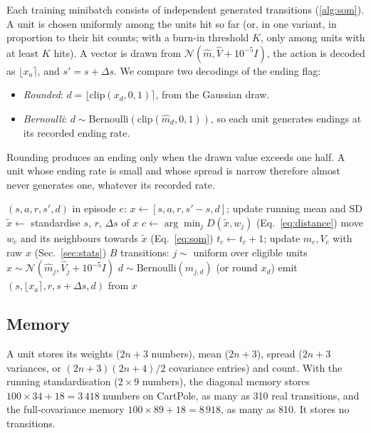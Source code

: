 \documentclass{article}
\newcommand{\dS}{\Delta s}
\begin{document}
Each training minibatch consists of independent generated transitions
(\cref{alg:som}). A unit is chosen uniformly among the units hit so far (or,
in one variant, in proportion to their hit counts; with a burn-in threshold
$K$, only among units with at least $K$ hits). A vector is drawn from
$\mathcal{N}(\hat{m}, \hat{V} + 10^{-5} I)$, the action is decoded as
$\lfloor x_a \rceil$, and $s' = s + \dS$. We compare two decodings of the
ending flag:
\begin{itemize}
\item \emph{Rounded}: $d = \lfloor \mathrm{clip}(x_d, 0, 1) \rceil$, from the
  Gaussian draw.
\item \emph{Bernoulli}: $d \sim \mathrm{Bernoulli}(\mathrm{clip}(\hat{m}_d, 0,
  1))$, so each unit generates endings at its recorded ending rate.
\end{itemize}
Rounding produces an ending only when the drawn value exceeds one half. A
unit whose ending rate is small and whose spread is narrow therefore almost
never generates one, whatever its recorded rate.

\begin{algorithm}[t]
\caption{SOM replay memory: learning one transition and generating a minibatch.}
\label{alg:som}
\begin{algorithmic}
 $(s, a, r, s', d)$ in episode $e$:
\STATE \quad $x \leftarrow [s, a, r, s' - s, d]$; update running mean and SD
\STATE \quad $\tilde{x} \leftarrow$ standardise $s$, $r$, $\dS$ of $x$
\STATE \quad $c \leftarrow \arg\min_j D(\tilde{x}, w_j)$ \hfill (Eq.~\ref{eq:distance})
\STATE \quad move $w_c$ and its neighbours towards $\tilde{x}$ \hfill (Eq.~\ref{eq:som})
\STATE \quad $t_c \leftarrow t_c + 1$; update $m_c, V_c$ with raw $x$ \hfill (Sec.~\ref{sec:stats})
 $B$ transitions:
\STATE $j \sim$ uniform over eligible units
\STATE $x \sim \mathcal{N}(\hat{m}_j, \hat{V}_j + 10^{-5} I)$
\STATE $d \sim \mathrm{Bernoulli}(\hat{m}_{j,d})$ \quad (or round $x_d$)
\STATE emit $(s, \lfloor x_a \rceil, r, s + \dS, d)$ from $x$
\ENDFOR
\end{algorithmic}
\end{algorithm}

\subsection{Memory}
\label{sec:memory}

A unit stores its weights ($2n+3$ numbers), mean ($2n+3$), spread ($2n+3$
variances, or $(2n+3)(2n+4)/2$ covariance entries) and count. With the
running standardisation ($2 \times 9$ numbers), the diagonal memory stores
$100 \times 34 + 18 = 3\,418$ numbers on CartPole, as many as 310 real
transitions, and the full-covariance memory $100 \times 89 + 18 = 8\,918$,
as many as 810. It stores no transitions.
\end{document}
